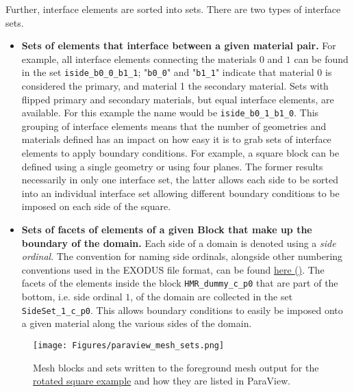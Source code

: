 Further, interface elements are sorted into sets. There are two types of interface sets.
\begin{itemize}
    \item \textbf{Sets of elements that interface between a given material pair.} For example, all interface elements connecting the materials $0$ and $1$ can be found in the set \texttt{iside\_b0\_0\_b1\_1}; "\texttt{b0\_0}" and "\texttt{b1\_1}" indicate that material 0 is considered the primary, and material 1 the secondary material. Sets with flipped primary and secondary materials, but equal interface elements, are available. For this example the name would be \texttt{iside\_b0\_1\_b1\_0}. 
    This grouping of interface elements means that the number of geometries and materials defined has an impact on how easy it is to grab sets of interface elements to apply boundary conditions. For example, a square block can be defined using a single geometry or using four planes. The former results necessarily in only one interface set, the latter allows each side to be sorted into an individual interface set allowing different boundary conditions to be imposed on each side of the square.

    \item \textbf{Sets of facets of elements of a given Block that make up the boundary of the domain.} Each side of a domain is denoted using a \emph{side ordinal}. The convention for naming side ordinals, alongside other numbering conventions used in the EXODUS file format, can be found \href{https://sandialabs.github.io/seacas-docs/html/md_include_exodus_element_types.html}{here (\ExternalLink)}.
    The facets of the elements inside the block \texttt{HMR\_dummy\_c\_p0} that are part of the bottom, i.e. side ordinal $1$, of the domain are collected in the set \texttt{SideSet\_1\_c\_p0}. This allows boundary conditions to easily be imposed onto a given material along the various sides of the domain.
\end{itemize}

\begin{figure}[h]
    \begin{center}
    \texttt{[image: Figures/paraview\_mesh\_sets.png]}
    \caption{Mesh blocks and sets written to the foreground mesh output for the \href{https://github.com/kkmaute/moris/blob/main/share/doc/mesh_generation/examples/Rotated_Square_Example.xml}{rotated square example} and how they are listed in ParaView.} 
    \label{fig:meshsets_paraview}
    \end{center}
\end{figure}


